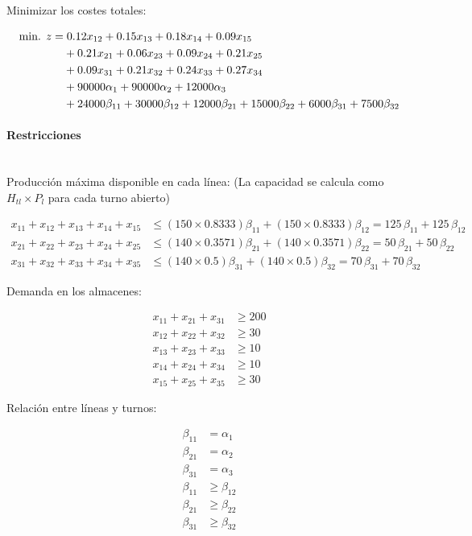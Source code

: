 Minimizar los costes totales:

\begin{align}
\mbox{min. } z = & \; 0.12x_{12} + 0.15x_{13} + 0.18x_{14} + 0.09x_{15} \notag\\
& + 0.21x_{21} + 0.06x_{23} + 0.09x_{24} + 0.21x_{25} \notag\\
& + 0.09x_{31} + 0.21x_{32} + 0.24x_{33} + 0.27x_{34} \notag\\
& + 90000\alpha_1 + 90000\alpha_2 + 12000\alpha_3 \notag\\
& + 24000\beta_{11} + 30000\beta_{12} + 12000\beta_{21} + 15000\beta_{22} + 6000\beta_{31} + 7500\beta_{32}
\end{align}

\paragraph{Restricciones}\mbox{}\\

Producción máxima disponible en cada línea:  
(La capacidad se calcula como $H_{tl} \times P_l$ para cada turno abierto)

\begin{align}
x_{11}+x_{12}+x_{13}+x_{14}+x_{15} &\le (150\times0.8333)\beta_{11} + (150\times0.8333)\beta_{12} = 125\,\beta_{11} + 125\,\beta_{12} \\
x_{21}+x_{22}+x_{23}+x_{24}+x_{25} &\le (140\times0.3571)\beta_{21} + (140\times0.3571)\beta_{22} = 50\,\beta_{21} + 50\,\beta_{22} \\
x_{31}+x_{32}+x_{33}+x_{34}+x_{35} &\le (140\times0.5)\beta_{31} + (140\times0.5)\beta_{32} = 70\,\beta_{31} + 70\,\beta_{32}
\end{align}

Demanda en los almacenes:

\begin{align}
x_{11}+x_{21}+x_{31} &\ge 200 \\
x_{12}+x_{22}+x_{32} &\ge 30 \\
x_{13}+x_{23}+x_{33} &\ge 10 \\
x_{14}+x_{24}+x_{34} &\ge 10 \\
x_{15}+x_{25}+x_{35} &\ge 30
\end{align}

Relación entre líneas y turnos:

\begin{align}
\beta_{11} &= \alpha_1 \\
\beta_{21} &= \alpha_2 \\
\beta_{31} &= \alpha_3 \\
\beta_{11} &\ge \beta_{12} \\
\beta_{21} &\ge \beta_{22} \\
\beta_{31} &\ge \beta_{32}
\end{align}

